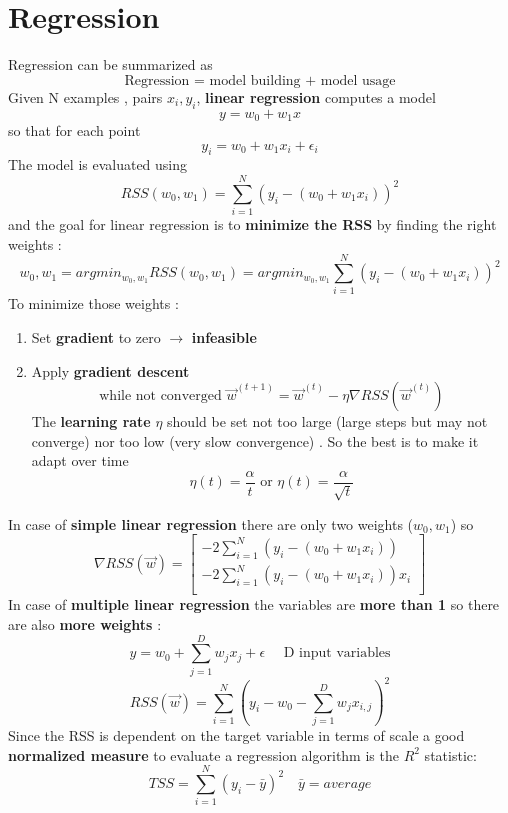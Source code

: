 \newpage
\section{Regression}
Regression can be summarized as 
$$ \text{Regression = model building + model usage}$$
Given N examples , pairs $x_i,y_i$,  \textbf{linear regression} computes a model $$y = w_0 + w_1x $$ so that for each point $$ y_i = w_0 + w_1x_i + \epsilon_i$$
The model is evaluated using $$ RSS(w_0,w_1)= \sum \limits_{i=1}^{N} (y_i-(w_0+w_1x_i))^2$$ and the goal for linear regression is to \textbf{minimize the RSS} by finding the right weights : 
$$ w_0,w_1 = arg min_{w_0,w_1} RSS(w_0,w_1)=arg min_{w_0,w_1}\sum \limits_{i=1}^{N} (y_i-(w_0+w_1x_i))^2 $$
To minimize those weights :
\begin{enumerate}
\item Set \textbf{gradient} to zero $\rightarrow$ \textbf{infeasible}
\item Apply \textbf{gradient descent} $$  \text{while not converged } \overrightarrow{w}^{(t+1)} = \overrightarrow{w}^{(t)} - \eta \nabla RSS(\overrightarrow{w}^{(t)})$$
The \textbf{learning rate} $\eta$ should be set not too large (large steps but may not converge) nor too low (very slow convergence) . So the best is to make it adapt over time $$ \eta(t) = \frac{\alpha}{t} \text{ or } \eta(t) = \frac{\alpha}{\sqrt{t}}$$
\end{enumerate}
In case of \textbf{simple linear regression} there are only two weights ($w_0,w_1$) so 
$$ \nabla RSS(\overrightarrow{w})=
\begin{bmatrix}
    -2 \sum \limits_{i=1}^{N} (y_i - (w_0 + w_1x_i))       \\
    -2 \sum \limits_{i=1}^{N} (y_i - (w_0 + w_1x_i))x_i       \\
\end{bmatrix}
$$
In case of \textbf{multiple linear regression} the variables are \textbf{more than 1} so there are also \textbf{more weights} : 
$$ y= w_0 + \sum \limits_{j=1}^{D} w_jx_j + \epsilon \quad \text{ D input variables}$$
$$ RSS(\overrightarrow{w})=\sum \limits_{i=1}^{N} (y_i - w_0 - \sum \limits_{j=1}^{D}w_jx_{i,j})^2$$
Since the RSS is dependent on the target variable in terms of scale a good \textbf{normalized measure} to evaluate a regression algorithm is the $R^2$ statistic:
$$ TSS = \sum \limits_{i=1}^N (y_i - \bar{y})^2 \quad \bar{y}= average$$
